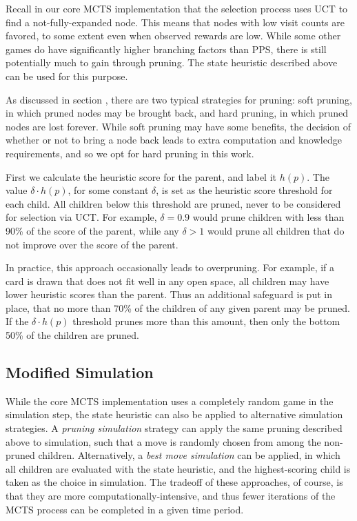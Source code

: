 \documentclass[letterpaper]{article}
\begin{document}
Recall in our core MCTS implementation that the selection process uses UCT to find a not-fully-expanded node. This means that nodes with low visit counts are favored, to some extent even when observed rewards are low. While some other games do have significantly higher branching factors than PPS, there is still potentially much to gain through pruning. The state heuristic described above can be used for this purpose.

As discussed in section {\it {}}, there are two typical strategies for pruning: soft pruning, in which pruned nodes may be brought back, and hard pruning, in which pruned nodes are lost forever. While soft pruning may have some benefits, the decision of whether or not to bring a node back leads to extra computation and knowledge requirements, and so we opt for hard pruning in this work.

First we calculate the heuristic score for the parent, and label it $h(p)$. The value $\delta \cdot h(p)$, for some constant $\delta$, is set as the heuristic score threshold for each child. All children below this threshold are pruned, never to be considered for selection via UCT. For example, $\delta = 0.9$ would prune children with less than 90\% of the score of the parent, while any $\delta > 1$ would prune all children that do not improve over the score of the parent.

In practice, this approach occasionally leads to overpruning. For example, if a card is drawn that does not fit well in any open space, all children may have lower heuristic scores than the parent. Thus an additional safeguard is put in place, that no more than 70\% of the children of any given parent may be pruned. If the  $\delta \cdot h(p)$ threshold prunes more than this amount, then only the bottom 50\% of the children are pruned.

\subsection{Modified Simulation}

While the core MCTS implementation uses a completely random game in the simulation step, the state heuristic can also be applied to alternative simulation strategies. A {\it pruning simulation} strategy can apply the same pruning described above to simulation, such that a move is randomly chosen from among the non-pruned children. Alternatively, a {\it best move simulation} can be applied, in which all children are evaluated with the state heuristic, and the highest-scoring child is taken as the choice in simulation. The tradeoff of these approaches, of course, is that they are more computationally-intensive, and thus fewer iterations of the MCTS process can be completed in a given time period. 
\end{document}
